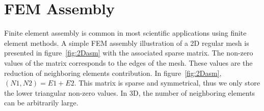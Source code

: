 \documentclass{IOS-Book-Article}
\begin{document}
\section{FEM Assembly}

Finite element assembly is common in most scientific applications using finite element methods.
A simple FEM assembly illustration of a 2D regular mesh is presented in figure~\ref{fig:2Dasm} with the associated sparse matrix.
The non-zero values of the matrix corresponds to the edges of the mesh. These values are the reduction of neighboring elements contribution. In figure~\ref{fig:2Dasm}, $(N1,N2) = E1 + E2$.
This matrix is sparse and symmetrical, thus we only store the lower triangular non-zero values.
In 3D, the number of neighboring elements can be arbitrarily large.
\end{document}
